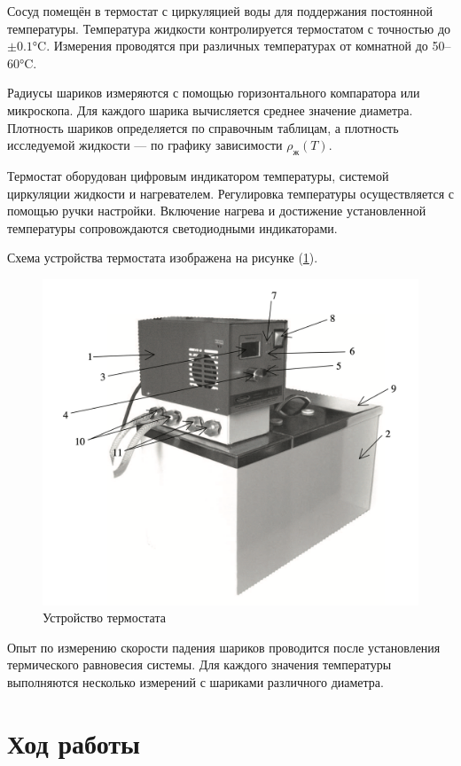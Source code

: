 \documentclass[a4paper,12pt]{article} %
\begin{document}
Сосуд помещён в термостат с циркуляцией воды для поддержания постоянной температуры. Температура жидкости контролируется термостатом с точностью до $\pm 0.1$°C. Измерения проводятся при различных температурах от комнатной до 50–60°C.

Радиусы шариков измеряются с помощью горизонтального компаратора или микроскопа. Для каждого шарика вычисляется среднее значение диаметра. Плотность шариков определяется по справочным таблицам, а плотность исследуемой жидкости — по графику зависимости $\rho_{ж}(T)$.

Термостат оборудован цифровым индикатором температуры, системой циркуляции жидкости и нагревателем. Регулировка температуры осуществляется с помощью ручки настройки. Включение нагрева и достижение установленной температуры сопровождаются светодиодными индикаторами.

Схема устройства термостата изображена на рисунке (\ref{fig:thermostat}).

\begin{figure}[h!]
	\centering
	\includegraphics[scale = 0.3]{thermostat.png}
	\caption{Устройство термостата}
	\label{fig:thermostat}
\end{figure}

Опыт по измерению скорости падения шариков проводится после установления термического равновесия системы. Для каждого значения температуры выполняются несколько измерений с шариками различного диаметра.


\section*{Ход работы}
\end{document}
